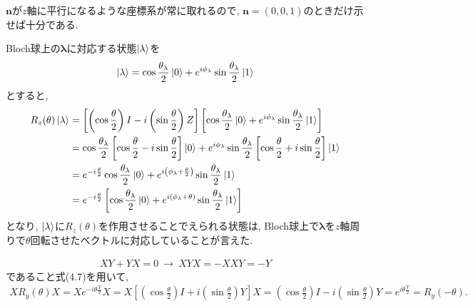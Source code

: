 \begin{ex}
    \label{ex4.6}
    $\bm{n}$が$z$軸に平行になるような座標系が常に取れるので, $\bm{n} = (0,0,1)$のときだけ示せば十分である.
    \par
    Bloch球上の$\bm{\lambda}$に対応する状態$\ket{\lambda}$を
    \begin{align*}
        \ket{\lambda}
        = \cos\frac{\theta_\lambda}{2} \ket{0} + e^{i \phi_\lambda} \sin\frac{\theta_\lambda}{2} \ket{1}
    \end{align*}
    とすると,
    \begin{align*}
        R_z(\theta) \ket{\lambda}
         & =
        \left[
            \left(\cos \frac{\theta}{2} \right) I -  i\left(\sin \frac{\theta}{2}\right) Z
            \right]
        \left[
            \cos\frac{\theta_\lambda}{2} \ket{0} + e^{i \phi_\lambda} \sin\frac{\theta_\lambda}{2} \ket{1}
            \right] \\
         & =
        \cos \frac{\theta_\lambda}{2}
        \left[
            \cos \frac{\theta}{2} -  i\sin \frac{\theta}{2}
            \right]
        \ket{0}
        +
        e^{i \phi_\lambda} \sin\frac{\theta_\lambda}{2}
        \left[
            \cos \frac{\theta}{2} +  i\sin \frac{\theta}{2}
            \right]
        \ket{1}     \\
         & =
        e^{-i\frac{\theta}{2}} \cos \frac{\theta_\lambda}{2}\ket{0}
        +
        e^{i \left(\phi_\lambda + \frac{\theta}{2} \right)} \sin\frac{\theta_\lambda}{2}
        \ket{1}     \\
         & =
        e^{-i\frac{\theta}{2}}
        \left[
            \cos \frac{\theta_\lambda}{2}
            \ket{0}
            +
            e^{i \left(\phi_\lambda + \theta \right)} \sin\frac{\theta_\lambda}{2}
            \ket{1}
            \right]
    \end{align*}
    となり, $\ket{\lambda}$に$R_z(\theta)$を作用させることでえられる状態は, Bloch球上で$\bm{\lambda}$を$z$軸周りで$\theta$回転させたベクトルに対応していることが言えた.
\end{ex}

\begin{ex}
    \label{ex4.7}
    \begin{align*}
        XY + YX = 0 \ \to \  XYX = -XXY = -Y
    \end{align*}
    であること式(4.7)を用いて,
    \begin{align*}
        X R_y(\theta) X
        =
        X e^{-i\theta \frac{Y}{2}} X
        =
        X
        \left[
            \left(\cos \frac{\theta}{2}\right) I + i\left(\sin \frac{\theta}{2}\right) Y
            \right]
        X
        =
        \left(\cos \frac{\theta}{2}\right) I - i\left(\sin \frac{\theta}{2}\right) Y
        =
        e^{i\theta \frac{Y}{2}}
        =
        R_y(-\theta).
    \end{align*}
\end{ex}

